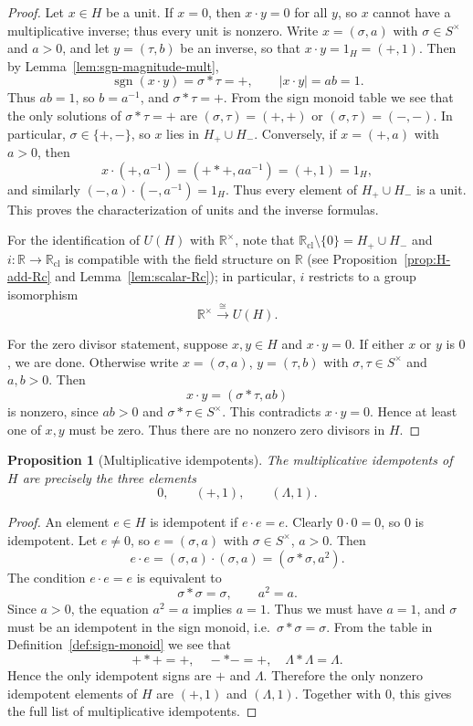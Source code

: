 \documentclass[11pt]{amsart}
\numberwithin{equation}{section}
\newtheorem{proposition}[theorem]{Proposition}
\theoremstyle{definition}
\theoremstyle{remark}
\newcommand{\R}{\mathbb{R}}
\newcommand{\Rc}{\mathbb{R}_{\mathrm{cl}}} %
\newcommand{\Hnum}{H}                      %
\newcommand{\Snon}{S^{\times}}             %
\newcommand{\sgn}{\operatorname{sgn}}
\newcommand{\iemb}{i}                      %
\newcommand{\idH}{1_H}
\begin{document}
\begin{proof}
Let $x\in\Hnum$ be a unit.  If $x=0$, then $x\cdot y=0$ for all $y$,
so $x$ cannot have a multiplicative inverse; thus every unit is
nonzero.  Write $x=(\sigma,a)$ with $\sigma\in\Snon$ and $a>0$, and
let $y=(\tau,b)$ be an inverse, so that $x\cdot y=\idH=(+,1)$.  Then
by Lemma~\ref{lem:sgn-magnitude-mult},
\[
  \sgn(x\cdot y)
  = \sigma*\tau = +,\qquad
  |x\cdot y| = ab = 1.
\]
Thus $ab=1$, so $b=a^{-1}$, and $\sigma*\tau=+$.  From the sign monoid
table we see that the only solutions of $\sigma*\tau=+$ are
$(\sigma,\tau)=(+,+)$ or $(\sigma,\tau)=(-,-)$.  In particular,
$\sigma\in\{+,-\}$, so $x$ lies in $H_+\cup H_-$.  Conversely, if
$x=(+,a)$ with $a>0$, then
\[
  x\cdot(+,a^{-1}) = (+*+,aa^{-1}) = (+,1) = \idH,
\]
and similarly $(-,a)\cdot(-,a^{-1})=\idH$.  Thus every element of
$H_+\cup H_-$ is a unit.  This proves the characterization of units and
the inverse formulas.

For the identification of $U(\Hnum)$ with $\R^\times$, note that
$\Rc\setminus\{0\} = H_+\cup H_-$ and $\iemb:\R\to\Rc$ is compatible with the field structure on $\R$ (see
Proposition~\ref{prop:H-add-Rc} and Lemma~\ref{lem:scalar-Rc});
in particular, $\iemb$ restricts
to a group isomorphism
\[
  \R^\times \xrightarrow{\;\cong\;} U(\Hnum).
\]

For the zero divisor statement, suppose $x,y\in\Hnum$ and
$x\cdot y=0$.  If either $x$ or $y$ is $0$, we are done.  Otherwise
write $x=(\sigma,a)$, $y=(\tau,b)$ with $\sigma,\tau\in\Snon$ and
$a,b>0$.  Then
\[
  x\cdot y = (\sigma*\tau,ab)
\]
is nonzero, since $ab>0$ and $\sigma*\tau\in\Snon$.  This contradicts
$x\cdot y=0$.  Hence at least one of $x,y$ must be zero.  Thus there
are no nonzero zero divisors in $\Hnum$.
\end{proof}

\begin{proposition}[Multiplicative idempotents]\label{prop:H-idempotents}
The multiplicative idempotents of $\Hnum$ are precisely the three
elements
\[
  0,\qquad (+,1),\qquad (\Lambda,1).
\]
\end{proposition}

\begin{proof}
An element $e\in\Hnum$ is idempotent if $e\cdot e=e$.  Clearly
$0\cdot 0=0$, so $0$ is idempotent.  Let $e\ne0$, so $e=(\sigma,a)$
with $\sigma\in\Snon$, $a>0$.  Then
\[
  e\cdot e
  = (\sigma,a)\cdot(\sigma,a)
  = (\sigma*\sigma, a^2).
\]
The condition $e\cdot e=e$ is equivalent to
\[
  \sigma*\sigma=\sigma,\qquad a^2=a.
\]
Since $a>0$, the equation $a^2=a$ implies $a=1$.  Thus we must have
$a=1$, and $\sigma$ must be an idempotent in the sign monoid, i.e.\
$\sigma*\sigma=\sigma$.  From the table in
Definition~\ref{def:sign-monoid} we see that
\[
  +*+ = +,\quad - * - = +,\quad \Lambda*\Lambda=\Lambda.
\]
Hence the only idempotent signs are $+$ and $\Lambda$.  Therefore the
only nonzero idempotent elements of $\Hnum$ are $(+,1)$ and
$(\Lambda,1)$.  Together with $0$, this gives the full list of
multiplicative idempotents.
\end{proof}
\end{document}

